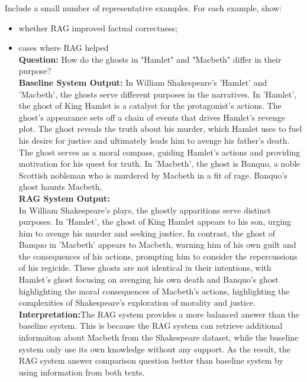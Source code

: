 \documentclass[10pt,conference]{IEEEtran}
\begin{document}
Include a small number of representative examples. 
For each example, show:

\begin{itemize}
    \item whether RAG improved factual correctness;
    \item cases where RAG helped\\
    \textbf{Question:}  
How do the ghosts in "Hamlet" and "Macbeth" differ in their purpose?\\
    \textbf{Baseline System Output:}  
    In William Shakespeare's 'Hamlet' and 'Macbeth', the ghosts serve different purposes in the narratives. In 'Hamlet', the ghost of King Hamlet is a catalyst for the protagonist's actions. The ghost's appearance sets off a chain of events that drives Hamlet's revenge plot. The ghost reveals the truth about his murder, which Hamlet uses to fuel his desire for justice and ultimately leads him to avenge his father's death. The ghost serves as a moral compass, guiding Hamlet's actions and providing motivation for his quest for truth. In 'Macbeth', the ghost is Banquo, a noble Scottish nobleman who is murdered by Macbeth in a fit of rage. Banquo's ghost haunts Macbeth,\\
    
    \textbf{RAG System Output:}  \\
    In William Shakespeare's plays, the ghostly apparitions serve distinct purposes. In 'Hamlet', the ghost of King Hamlet appears to his son, urging him to avenge his murder and seeking justice. In contrast, the ghost of Banquo in 'Macbeth' appears to Macbeth, warning him of his own guilt and the consequences of his actions, prompting him to consider the repercussions of his regicide. These ghosts are not identical in their intentions, with Hamlet's ghost focusing on avenging his own death and Banquo's ghost highlighting the moral consequences of Macbeth's actions, highlighting the complexities of Shakespeare's exploration of morality and justice.\\
    
    \textbf{Interpretation:}The RAG system provides a more balanced answer than the baseline system. This is because the RAG system can retrieve additional informaiton about Macbeth from the Shakespeare dataset, while the baseline system only use its own knowledge without any support.  As the result, the RAG system answer comparison question better than baseline system by using information from both texts.\\


\end{itemize}
\end{document}
